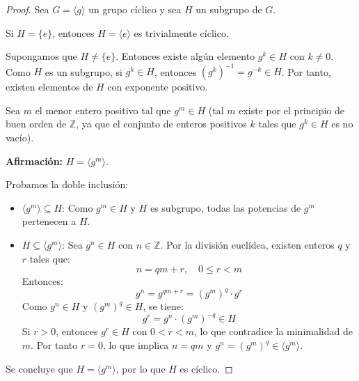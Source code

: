 \documentclass[11pt,a4paper]{article}
\theoremstyle{plain}
\theoremstyle{definition}
\begin{document}
\begin{proof}
Sea $G = \langle g \rangle$ un grupo cíclico y sea $H$ un subgrupo de $G$.

Si $H = \{e\}$, entonces $H = \langle e \rangle$ es trivialmente cíclico.

Supongamos que $H \neq \{e\}$. Entonces existe algún elemento $g^k \in H$ con $k \neq 0$. Como $H$ es un subgrupo, si $g^k \in H$, entonces $(g^k)^{-1} = g^{-k} \in H$. Por tanto, existen elementos de $H$ con exponente positivo.

Sea $m$ el menor entero positivo tal que $g^m \in H$ (tal $m$ existe por el principio de buen orden de $\mathbb{Z}$, ya que el conjunto de enteros positivos $k$ tales que $g^k \in H$ es no vacío).

\textbf{Afirmación:} $H = \langle g^m \rangle$.

Probamos la doble inclusión:
\begin{itemize}
\item $\langle g^m \rangle \subseteq H$: Como $g^m \in H$ y $H$ es subgrupo, todas las potencias de $g^m$ pertenecen a $H$.

\item $H \subseteq \langle g^m \rangle$: Sea $g^n \in H$ con $n \in \mathbb{Z}$. Por la división euclídea, existen enteros $q$ y $r$ tales que:
\[
n = qm + r, \quad 0 \leq r < m
\]
Entonces:
\[
g^n = g^{qm+r} = (g^m)^q \cdot g^r
\]
Como $g^n \in H$ y $(g^m)^q \in H$, se tiene:
\[
g^r = g^n \cdot (g^m)^{-q} \in H
\]
Si $r > 0$, entonces $g^r \in H$ con $0 < r < m$, lo que contradice la minimalidad de $m$. Por tanto $r = 0$, lo que implica $n = qm$ y $g^n = (g^m)^q \in \langle g^m \rangle$.
\end{itemize}

Se concluye que $H = \langle g^m \rangle$, por lo que $H$ es cíclico.
\end{proof}
\end{document}
